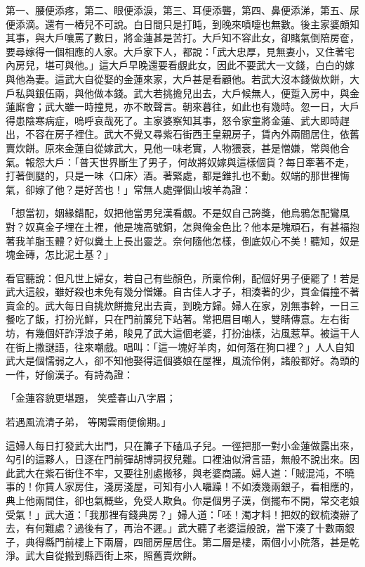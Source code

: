\begin{showcontents}{}
第一、腰便添疼，第二、眼便添淚，第三、耳便添聾，第四、鼻便添涕，第五、尿便添滴。還有一樁兒不可說。白日間只是打盹，到晚來噴嚏也無數。後主家婆頗知其事，與大戶嚷罵了數日，將金蓮甚是苦打。大戶知不容此女，卻賭氣倒陪房奩，要尋嫁得一個相應的人家。大戶家下人，都說：「武大忠厚，見無妻小，又住著宅內房兒，堪可與他。」這大戶早晚還要看覷此女，因此不要武大一文錢，白白的嫁與他為妻。這武大自從娶的金蓮來家，大戶甚是看顧他。若武大沒本錢做炊餅，大戶私與銀伍兩，與他做本錢。武大若挑擔兒出去，大戶候無人，便踅入房中，與金蓮廝會；武大雖一時撞見，亦不敢聲言。朝來暮往，如此也有幾時。忽一日，大戶得患陰寒病症，嗚呼哀哉死了。主家婆察知其事，怒令家童將金蓮、武大即時趕出，不容在房子裡住。武大不覺又尋紫石街西王皇親房子，賃內外兩間居住，依舊賣炊餅。原來金蓮自從嫁武大，見他一味老實，人物猥衰，甚是憎嫌，常與他合氣。報怨大戶：「普天世界斷生了男子，何故將奴嫁與這樣個貨？每日牽著不走，打著倒腿的，只是一味〈口床〉酒。著緊處，都是錐扎也不動。奴端的那世裡悔氣，卻嫁了他？是好苦也！」常無人處彈個山坡羊為證：

「想當初，姻緣錯配，奴把他當男兒漢看覷。不是奴自己誇獎，他烏鴉怎配鸞凰對？奴真金子埋在土裡，他是塊高號銅，怎與俺金色比？他本是塊頑石，有甚福抱著我羊脂玉體？好似糞土上長出靈芝。奈何隨他怎樣，倒底奴心不美！聽知，奴是塊金磚，怎比泥土基？」

看官聽說：但凡世上婦女，若自己有些顏色，所稟伶俐，配個好男子便罷了！若是武大這般，雖好殺也未免有幾分憎嫌。自古佳人才子，相湊著的少，買金偏撞不著賣金的。武大每日自挑炊餅擔兒出去賣，到晚方歸。婦人在家，別無事幹，一日三餐吃了飯，打扮光鮮，只在門前簾兒下站著。常把眉目嘲人，雙睛傳意。左右街坊，有幾個奸詐浮浪子弟，睃見了武大這個老婆，打扮油樣，沾風惹草。被這干人在街上撒謎語，往來嘲戲。唱叫：「這一塊好羊肉，如何落在狗口裡？」人人自知武大是個懦弱之人，卻不知他娶得這個婆娘在屋裡，風流伶俐，諸般都好。為頭的一件，好偷漢子。有詩為證：

「金蓮容貌更堪題，  笑蹙春山八字眉；

若遇風流清子弟，  等閑雲雨便偷期。」

這婦人每日打發武大出門，只在簾子下磕瓜子兒。一徑把那一對小金蓮做露出來，勾引的這夥人，日逐在門前彈胡博詞扠兒難。口裡油似滑言語，無般不說出來。因此武大在紫石街住不牢，又要往別處搬移，與老婆商議。婦人道：「賊混沌，不曉事的！你賃人家房住，淺房淺屋，可知有小人囉躁！不如湊幾兩銀子，看相應的，典上他兩間住，卻也氣概些，免受人欺負。你是個男子漢，倒擺布不開，常交老娘受氣！」武大道：「我那裡有錢典房？」婦人道：「呸！濁才料！把奴的釵梳湊辦了去，有何難處？過後有了，再治不遲。」武大聽了老婆這般說，當下湊了十數兩銀子，典得縣門前樓上下兩層，四間房屋居住。第二層是樓，兩個小小院落，甚是乾淨。武大自從搬到縣西街上來，照舊賣炊餅。


\end{showcontents}
